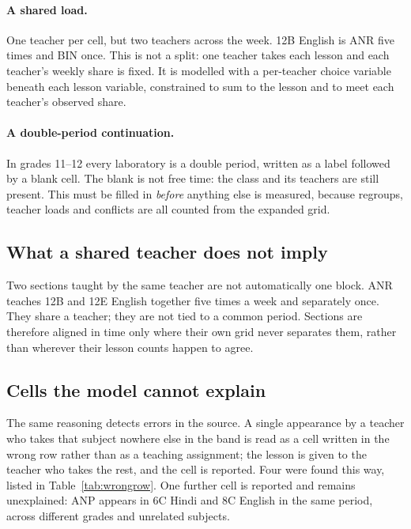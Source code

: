 \paragraph{A shared load.} One teacher per cell, but two teachers across the week. 12B English is
ANR five times and BIN once. This is not a split: one teacher takes each lesson and each
teacher's weekly share is fixed. It is modelled with a per-teacher choice variable beneath each
lesson variable, constrained to sum to the lesson and to meet each teacher's observed share.

\paragraph{A double-period continuation.} In grades 11--12 every laboratory is a double period,
written as a label followed by a blank cell. The blank is not free time: the class and its
teachers are still present. This must be filled in \emph{before} anything else is measured,
because regroups, teacher loads and conflicts are all counted from the expanded grid.

\subsection{What a shared teacher does not imply}

Two sections taught by the same teacher are not automatically one block. ANR teaches 12B and 12E
English together five times a week and separately once. They share a teacher; they are not tied
to a common period. Sections are therefore aligned in time only where their own grid never
separates them, rather than wherever their lesson counts happen to agree.

\subsection{Cells the model cannot explain}

The same reasoning detects errors in the source. A single appearance by a teacher who takes that
subject nowhere else in the band is read as a cell written in the wrong row rather than as a
teaching assignment; the lesson is given to the teacher who takes the rest, and the cell is
reported. Four were found this way, listed in Table~\ref{tab:wrongrow}. One further cell is
reported and remains unexplained: ANP appears in 6C Hindi and 8C English in the same period,
across different grades and unrelated subjects.

